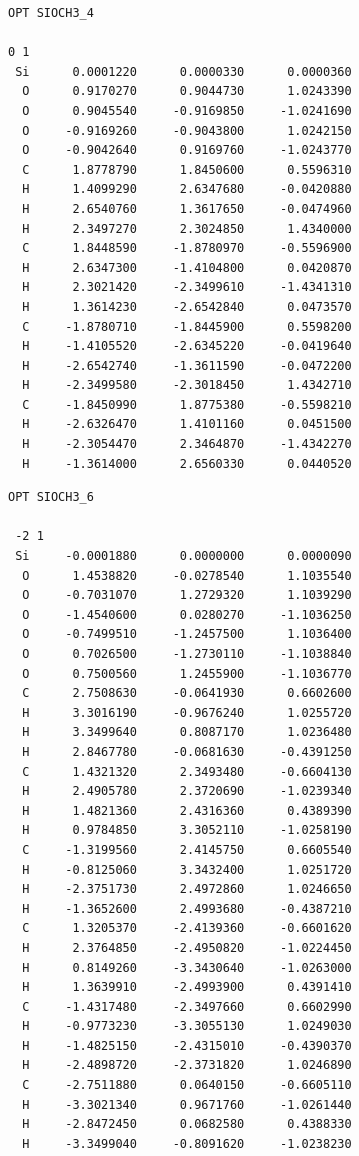 \documentclass[
  digital, %
  table,   %
  lof,     %
  lot,     %
  oneside,
]{fithesis3}
\begin{document}
 \begin{lstlisting}[frame=single, caption={\ce{Si(OCH3)4} },label=DescriptiveLabel]
OPT SIOCH3_4

0 1
 Si      0.0001220      0.0000330      0.0000360
  O      0.9170270      0.9044730      1.0243390
  O      0.9045540     -0.9169850     -1.0241690
  O     -0.9169260     -0.9043800      1.0242150
  O     -0.9042640      0.9169760     -1.0243770
  C      1.8778790      1.8450600      0.5596310
  H      1.4099290      2.6347680     -0.0420880
  H      2.6540760      1.3617650     -0.0474960
  H      2.3497270      2.3024850      1.4340000
  C      1.8448590     -1.8780970     -0.5596900
  H      2.6347300     -1.4104800      0.0420870
  H      2.3021420     -2.3499610     -1.4341310
  H      1.3614230     -2.6542840      0.0473570
  C     -1.8780710     -1.8445900      0.5598200
  H     -1.4105520     -2.6345220     -0.0419640
  H     -2.6542740     -1.3611590     -0.0472200
  H     -2.3499580     -2.3018450      1.4342710
  C     -1.8450990      1.8775380     -0.5598210
  H     -2.6326470      1.4101160      0.0451500
  H     -2.3054470      2.3464870     -1.4342270
  H     -1.3614000      2.6560330      0.0440520

 \end{lstlisting}

 \begin{lstlisting}[frame=single, caption={\ce{Si(OCH3)6} },label=DescriptiveLabel]
 OPT SIOCH3_6

 -2 1
 Si     -0.0001880      0.0000000      0.0000090
  O      1.4538820     -0.0278540      1.1035540
  O     -0.7031070      1.2729320      1.1039290
  O     -1.4540600      0.0280270     -1.1036250
  O     -0.7499510     -1.2457500      1.1036400
  O      0.7026500     -1.2730110     -1.1038840
  O      0.7500560      1.2455900     -1.1036770
  C      2.7508630     -0.0641930      0.6602600
  H      3.3016190     -0.9676240      1.0255720
  H      3.3499640      0.8087170      1.0236480
  H      2.8467780     -0.0681630     -0.4391250
  C      1.4321320      2.3493480     -0.6604130
  H      2.4905780      2.3720690     -1.0239340
  H      1.4821360      2.4316360      0.4389390
  H      0.9784850      3.3052110     -1.0258190
  C     -1.3199560      2.4145750      0.6605540
  H     -0.8125060      3.3432400      1.0251720
  H     -2.3751730      2.4972860      1.0246650
  H     -1.3652600      2.4993680     -0.4387210
  C      1.3205370     -2.4139360     -0.6601620
  H      2.3764850     -2.4950820     -1.0224450
  H      0.8149260     -3.3430640     -1.0263000
  H      1.3639910     -2.4993900      0.4391410
  C     -1.4317480     -2.3497660      0.6602990
  H     -0.9773230     -3.3055130      1.0249030
  H     -1.4825150     -2.4315010     -0.4390370
  H     -2.4898720     -2.3731820      1.0246890
  C     -2.7511880      0.0640150     -0.6605110
  H     -3.3021340      0.9671760     -1.0261440
  H     -2.8472450      0.0682580      0.4388330
  H     -3.3499040     -0.8091620     -1.0238230

 \end{lstlisting}
\end{document}
